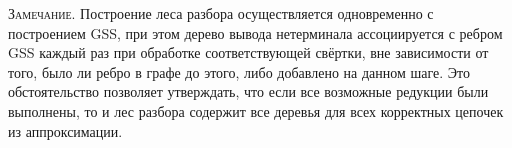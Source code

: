 \textsc{Замечание.} Построение леса разбора осуществляется одновременно с построением GSS, при этом дерево вывода нетерминала ассоциируется с ребром GSS каждый раз при обработке соответствующей свёртки, вне зависимости от того, было ли ребро в графе до этого, либо добавлено на данном шаге. Это обстоятельство позволяет утверждать, что если все возможные редукции были выполнены, то и лес разбора содержит все деревья для всех корректных цепочек из аппроксимации.